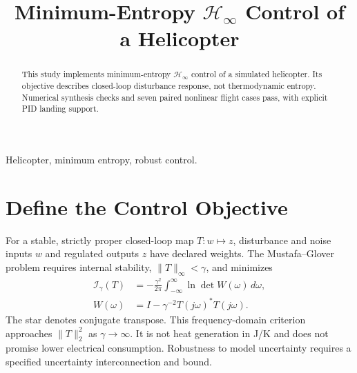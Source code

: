 
\title{Minimum-Entropy $\mathcal{H}_\infty$ Control of a Helicopter}
\author{
}
\date{}

\maketitle
\begin{abstract}
This study implements minimum-entropy $\mathcal H_\infty$ control of a
simulated helicopter. Its objective describes closed-loop disturbance response,
not thermodynamic entropy. Numerical synthesis checks and seven paired
nonlinear flight cases pass, with explicit PID landing support.
\end{abstract}
\begin{IEEEkeywords}
Helicopter, minimum entropy, robust control.
\end{IEEEkeywords}
\balance
\section{Define the Control Objective}
For a stable, strictly proper closed-loop map $T:w\mapsto z$, disturbance
and noise inputs $w$ and regulated outputs $z$ have declared weights.
The Mustafa--Glover problem requires internal stability,
$\|T\|_\infty<\gamma$, and minimizes~\cite{mustafa1990,lessard2014}
\begin{equation}
\begin{aligned}
\mathcal I_\gamma(T)&=-\frac{\gamma^2}{2\pi}
 \int_{-\infty}^{\infty}\ln\det W(\omega)\,d\omega,\\
W(\omega)&=I-\gamma^{-2}T(j\omega)^*T(j\omega).
\end{aligned}
\end{equation}
The star denotes conjugate transpose. This frequency-domain criterion approaches
$\|T\|_2^2$ as $\gamma\to\infty$. It is not heat generation in J/K and does not
promise lower electrical consumption. Robustness to model uncertainty requires
a specified uncertainty interconnection and bound.

